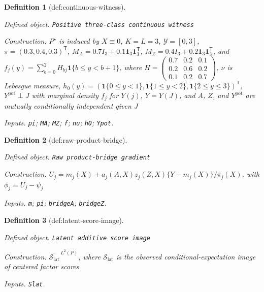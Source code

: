 \documentclass{article}
\newtheorem{definition}{Definition}
\begin{document}
\begin{definition}[def:continuous-witness]\label{def:continuous-witness}
\par\smallskip\noindent\emph{Defined object.} \texttt{Positive three-\allowbreak{}class continuous witness}
\par\smallskip\noindent\emph{Construction.} \(P^{\star}\) is induced by \(X\equiv0\), \(K=L=3\), \(\mathcal Y=[0,3]\), \(\pi=(0.3,0.4,0.3)^{\mathsf T}\), \(M_A=0.7I_3+0.1\mathbf 1_3\mathbf 1_3^{\mathsf T}\), \(M_Z=0.4I_3+0.2\mathbf 1_3\mathbf 1_3^{\mathsf T}\), and \(f_j(y)=\sum_{b=0}^{2}H_{bj}\mathbf 1\{b\leq y<b+1\}\), where \(H=\begin{pmatrix}0.7&0.2&0.1\\0.2&0.6&0.2\\0.1&0.2&0.7\end{pmatrix}\), \(\nu\) is Lebesgue measure, \(h_0(y)=(\mathbf 1\{0\leq y<1\},\mathbf 1\{1\leq y<2\},\mathbf 1\{2\leq y\leq3\})^{\mathsf T}\), \(Y^{\mathrm{pot}}\perp J\) with marginal density \(f_j\) for \(Y(j)\), \(Y=Y(J)\), and \(A\), \(Z\), and \(Y^{\mathrm{pot}}\) are mutually conditionally independent given \(J\)
\par\smallskip\noindent\emph{Inputs.} \texttt{pi}; \texttt{MA}; \texttt{MZ}; \texttt{f}; \texttt{nu}; \texttt{h0}; \texttt{Ypot}.
\end{definition}

\begin{definition}[def:raw-product-bridge]\label{def:raw-product-bridge}
\par\smallskip\noindent\emph{Defined object.} \texttt{Raw product-\allowbreak{}bridge gradient}
\par\smallskip\noindent\emph{Construction.} \(U_j=m_j(X)+a_j(A,X)z_j(Z,X)\{Y-m_j(X)\}/\pi_j(X)\), with \(\phi_j=U_j-\psi_j\)
\par\smallskip\noindent\emph{Inputs.} \texttt{m}; \texttt{pi}; \texttt{bridgeA}; \texttt{bridgeZ}.
\end{definition}

\begin{definition}[def:latent-score-image]\label{def:latent-score-image}
\par\smallskip\noindent\emph{Defined object.} \texttt{Latent additive score image}
\par\smallskip\noindent\emph{Construction.} \(\overline{\mathcal S_{\mathrm{lat}}}^{\,L^{2}(P)}\), where \(\mathcal S_{\mathrm{lat}}\) is the observed conditional-expectation image of centered factor scores
\par\smallskip\noindent\emph{Inputs.} \texttt{Slat}.
\end{definition}
\end{document}
